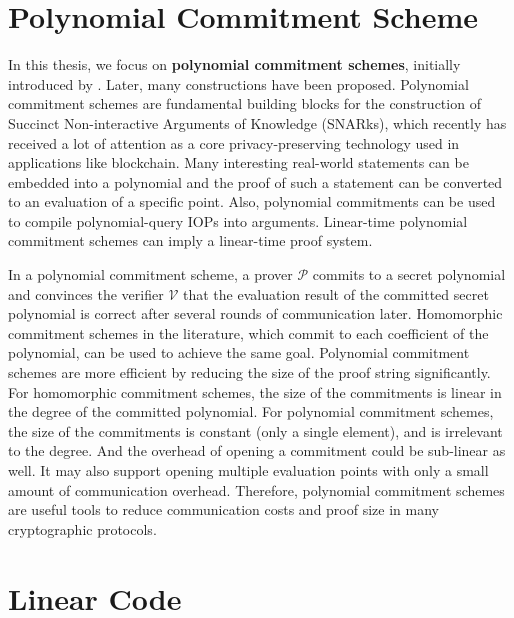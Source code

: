 \section{Polynomial Commitment Scheme}

In this thesis, we focus on \textbf{polynomial commitment schemes}, 
initially introduced by \cite{DBLP:conf/asiacrypt/KateZG10}.
Later, many constructions 
\cite{DBLP:conf/sp/TomescuCZAPGD20} 
\cite{DBLP:journals/iacr/YurekLFKM21} 
\cite{277222}
have been proposed.
Polynomial commitment schemes are fundamental building blocks for the construction of Succinct Non-interactive Arguments of Knowledge (SNARks), 
which recently has received a lot of attention as a core privacy-preserving technology used in applications like blockchain. Many interesting real-world statements can be embedded into a polynomial and the proof of such a statement can be converted to an evaluation of a specific point. Also, polynomial commitments can be used to compile polynomial-query IOPs into arguments. Linear-time polynomial commitment schemes can imply a linear-time proof system.

In a polynomial commitment scheme, a prover $\mathcal{P}$ commits to a secret polynomial and convinces the verifier $\mathcal{V}$ that the evaluation result of the committed secret polynomial is correct after several rounds of communication later. Homomorphic commitment schemes in the literature, which commit to each coefficient of the polynomial, can be used to achieve the same goal. Polynomial commitment schemes are more efficient by reducing the size of the proof string significantly. For homomorphic commitment schemes, the size of the commitments is linear in the degree of the committed polynomial. For polynomial commitment schemes, the size of the commitments is constant (only a single element), and is irrelevant to the degree. And the overhead of opening a commitment could be sub-linear as well. It may also support opening multiple evaluation points with only a small amount of communication overhead. Therefore, polynomial commitment schemes are useful tools to reduce communication costs and proof size in many cryptographic protocols.

\section{Linear Code}

